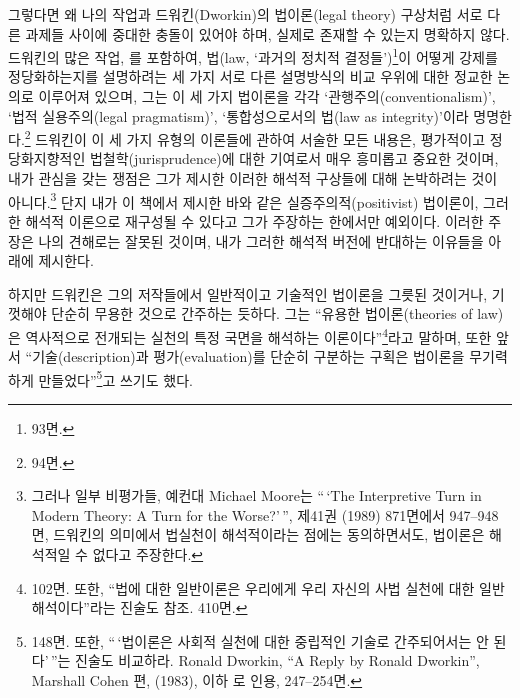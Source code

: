 그렇다면 왜 나의 작업과 드워킨(Dworkin)의 법이론(legal theory) 구상처럼
서로 다른 과제들 사이에 중대한 충돌이 있어야 하며, 실제로 존재할 수
있는지 명확하지 않다. 드워킨의 많은 작업, 를
포함하여, 법(law, `과거의 정치적 결정들')\footnote{ 93면.}이
어떻게 강제를 정당화하는지를 설명하려는 세 가지 서로 다른 설명방식의
비교 우위에 대한 정교한 논의로 이루어져 있으며, 그는 이 세 가지 법이론을
각각 `관행주의(conventionalism)', `법적 실용주의(legal pragmatism)',
`통합성으로서의 법(law as integrity)'이라 명명한다.\footnote{
  94면.} 드워킨이 이 세 가지 유형의 이론들에 관하여 서술한 모든 내용은,
평가적이고 정당화지향적인 법철학(jurisprudence)에 대한 기여로서 매우
흥미롭고 중요한 것이며, 내가 관심을 갖는 쟁점은 그가 제시한 이러한
해석적 구상들에 대해 논박하려는 것이 아니다.\footnote{그러나 일부
  비평가들, 예컨대 Michael Moore는 ``\,`The Interpretive Turn in Modern
  Theory: A Turn for the Worse?'\,'',  제41권
  (1989) 871면에서 947--948면, 드워킨의 의미에서 법실천이 해석적이라는
  점에는 동의하면서도, 법이론은 해석적일 수 없다고 주장한다.} 단지 내가
이 책에서 제시한 바와 같은 실증주의적(positivist) 법이론이, 그러한
해석적 이론으로 재구성될 수 있다고 그가 주장하는 한에서만 예외이다.
이러한 주장은 나의 견해로는 잘못된 것이며, 내가 그러한 해석적 버전에
반대하는 이유들을 아래에 제시한다.

하지만 드워킨은 그의 저작들에서 일반적이고 기술적인 법이론을 그릇된
것이거나, 기껏해야 단순히 무용한 것으로 간주하는 듯하다. 그는 ``유용한
법이론(theories of law)은 역사적으로 전개되는 실천의 특정 국면을
해석하는 이론이다''\footnote{ 102면. 또한, ``법에 대한
  일반이론은 우리에게 우리 자신의 사법 실천에 대한 일반 해석이다''라는
  진술도 참조.  410면.}라고 말하며, 또한 앞서
``기술(description)과 평가(evaluation)를 단순히 구분하는 구획은 법이론을
무기력하게 만들었다''\footnote{ 148면. 또한, ``\,`법이론은
  사회적 실천에 대한 중립적인 기술로 간주되어서는 안 된다'\,''는 진술도
  비교하라. Ronald Dworkin, ``A Reply by Ronald Dworkin'', Marshall
  Cohen 편,  (1983),
  이하 로 인용, 247--254면.}고 쓰기도 했다.

